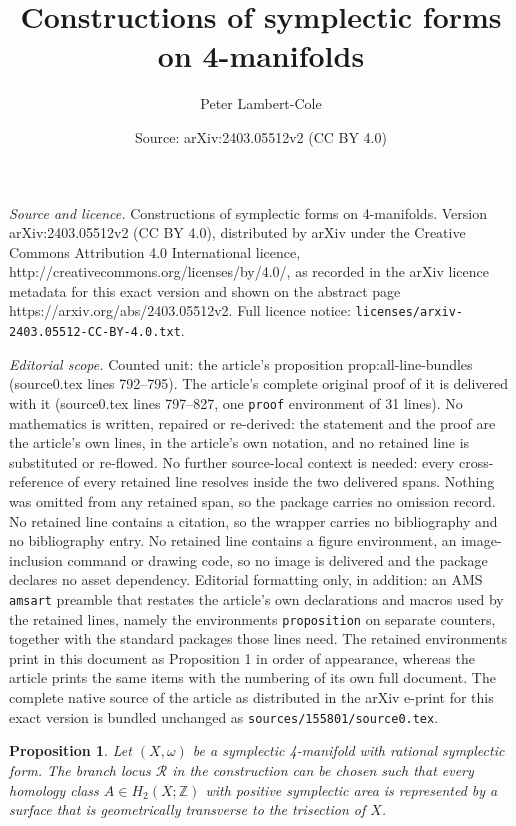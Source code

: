 \documentclass[10pt,a4paper]{amsart}
\title{Constructions of symplectic forms on 4-manifolds}
\author{Peter Lambert-Cole}
\date{Source: arXiv:2403.05512v2 (CC BY 4.0)}
\newtheorem{proposition}{Proposition}
\newcommand{\ZZ}{\mathbb{Z}}
\newcommand{\cR}{\mathcal{R}}
\begin{document}
\maketitle

\noindent\emph{Source and licence.} Constructions of symplectic forms on 4-manifolds. Version arXiv:2403.05512v2 (CC BY 4.0), distributed by arXiv under the Creative Commons Attribution 4.0 International licence, http://creativecommons.org/licenses/by/4.0/, as recorded in the arXiv licence metadata for this exact version and shown on the abstract page https://arxiv.org/abs/2403.05512v2. Full licence notice: \texttt{licenses/arxiv-2403.05512-CC-BY-4.0.txt}.\par\smallskip

\noindent\textit{Editorial scope.} Counted unit: the article's proposition prop:all-line-bundles (source0.tex lines 792--795). The article's complete original proof of it is delivered with it (source0.tex lines 797--827, one \texttt{proof} environment of 31 lines). No mathematics is written, repaired or re-derived: the statement and the proof are the article's own lines, in the article's own notation, and no retained line is substituted or re-flowed.  No further source-local context is needed: every cross-reference of every retained line resolves inside the two delivered spans.  Nothing was omitted from any retained span, so the package carries no omission record.  No retained line contains a citation, so the wrapper carries no bibliography and no bibliography entry.  No retained line contains a figure environment, an image-inclusion command or drawing code, so no image is delivered and the package declares no asset dependency.  Editorial formatting only, in addition: an AMS \texttt{amsart} preamble that restates the article's own declarations and macros used by the retained lines, namely the environments \texttt{proposition} on separate counters, together with the standard packages those lines need.  The retained environments print in this document as Proposition 1 in order of appearance, whereas the article prints the same items with the numbering of its own full document.  The complete native source of the article as distributed in the arXiv e-print for this exact version is bundled unchanged as \texttt{sources/155801/source0.tex}.
\begin{proposition}
\label{prop:all-line-bundles}
    Let $(X,\omega)$ be a symplectic 4-manifold with rational symplectic form. The branch locus $\cR$ in the construction can be chosen such that every homology class $A \in H_2(X;\ZZ)$ with positive symplectic area is represented by a surface that is geometrically transverse to the trisection of $X$.
\end{proposition}
\end{document}
